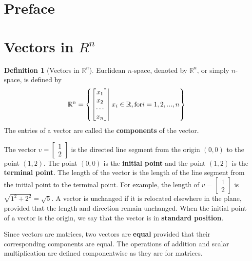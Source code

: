 \documentclass{article}
\theoremstyle{definition}
\newtheorem{definition}{Definition}
\newcommand{\reals}{\mathbb{R}}
\newcommand{\bmat}[1]{\begin{bmatrix}#1\end{bmatrix}}
\begin{document}
\setcounter{section}{-1}
\section{Preface}
\section[Vectors in R^n]{Vectors in $R^n$}
\begin{definition}[Vectors in $\reals^n$]
	Euclidean $n$-space, denoted by $\reals^n$, or simply $n$-space, is defined by
	\[ \reals^n = \left\{ \bmat{x_1\\x_2\\\cdots\\x_n} \vrule \; x_i \in \reals, \text{for} i = 1, 2, ..., n \right\} \]
	The entries of a vector are called the \textbf{components} of the vector.
\end{definition}
The vector $v = \left[\begin{smallmatrix} 1\\2 \end{smallmatrix}\right]$ is the directed line segment from the origin $(0, 0)$ to the point $(1, 2)$. The point $(0, 0)$ is the \textbf{initial point} and the point $(1,2)$ is the \textbf{terminal point}. The length of the vector is the length of the line segment from the initial point to the terminal point. For example, the length of $v = \bmat{1\\2}$ is $\sqrt{1^2 + 2^2} = \sqrt{5}$. A vector is unchanged if it is relocated elsewhere in the plane, provided that the length and direction remain unchanged. When the initial point of a vector is the origin, we say that the vector is in \textbf{standard position}.\par
Since vectors are matrices, two vectors are \textbf{equal} provided that their corresponding components are equal. The operations of addition and scalar multiplication are defined componentwise as they are for matrices.
\end{document}
